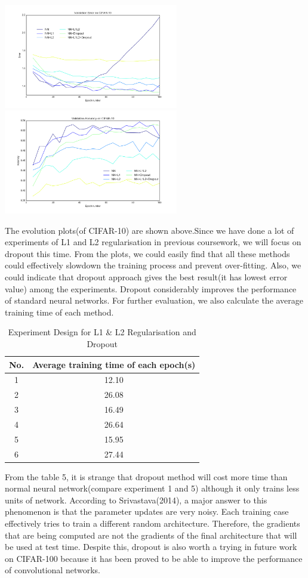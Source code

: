 \documentclass[]{article}
\begin{document}
\includegraphics[width=3in]{Regularisation_valid_err_2}
\includegraphics[width=3in]{Regularisation_valid_acc_2}

The evolution plots(of CIFAR-10) are shown above.Since we have done a lot of experiments of L1 and L2 regularisation in previous coursework, we will focus on dropout this time. From the plots, we could easily find that all these methods could effectively slowdown the training process and prevent over-fitting. Also, we could indicate that dropout approach gives the best result(it has lowest error value) among the experiments. Dropout considerably improves the performance of standard neural networks. For further evaluation, we also calculate the average training time of each method. 
\begin{table}[!ht]
\centering 
\caption{Experiment Design for L1 \& L2 Regularisation and Dropout}
\begin{tabular}{c c}
\toprule
No. & Average training time of each epoch(s) \\
\midrule
1 & 12.10\\
2 & 26.08\\
3 & 16.49\\
4 & 26.64\\
5 & 15.95\\
6 & 27.44\\
\bottomrule
\end{tabular}
\end{table}

From the table 5, it is strange that dropout method will cost more time than normal neural network(compare experiment 1 and 5) although it only trains less units of network. According to Srivastava(2014), a major answer to this phenomenon is that the parameter updates are very noisy. Each training case effectively tries to train a different random architecture. Therefore, the gradients that are being computed are not the gradients of the final architecture that will be used at test time. Despite this, dropout is also worth a trying in future work on CIFAR-100 because it has been proved to be able to improve the performance of convolutional networks.
\end{document}
